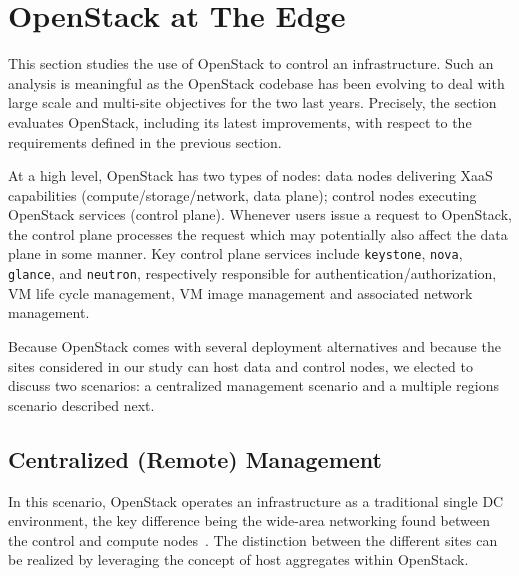 \vspace*{-.1cm}
\section{OpenStack at The Edge}
\label{sec:system_design_considerations}
\vspace*{-.1cm}

%
This section studies the use of OpenStack to control an \edge
infrastructure. Such an analysis is meaningful as the OpenStack
codebase has been evolving to deal with large scale and multi-site
objectives for the two last years. Precisely, the section evaluates
OpenStack, including its latest improvements, with respect to the requirements
defined in the previous section.


At a high level, OpenStack has two types of nodes: data nodes
delivering XaaS capabilities (compute/storage/network, \ie data
plane); control nodes executing OpenStack services (\ie control
plane). Whenever users issue a request to OpenStack, the control
plane processes the request which may potentially also affect the data plane in some manner. 
Key control plane services include \verb|keystone|,
\verb|nova|, \verb|glance|, and \verb|neutron|, respectively responsible for 
authentication/authorization, VM life cycle management, VM image management and
associated network management.

Because OpenStack comes with several deployment alternatives and
because the \edge sites considered in our study can host data and
control nodes, we elected to discuss two scenarios:
a centralized management scenario and a multiple regions scenario described next.

\subsection{Centralized (Remote) Management}
\label{subsec:centralized_os}
In this scenario, OpenStack operates an \edge infrastructure
as a traditional single DC environment, %
the key difference being the wide-area networking found between the
control and compute nodes~\cite{www:openstack-wanwide}. The
distinction between the different \edge sites can be realized by leveraging the
concept of host aggregates within OpenStack.

